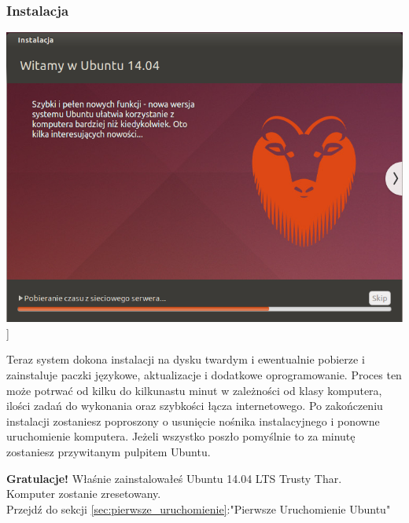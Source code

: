 \subsubsection{Instalacja}
\begin{center}
        \includegraphics[scale=0.5]{images/instalator_kopiowanie.png}]
\end{center}
Teraz system dokona instalacji na dysku twardym i ewentualnie pobierze i zainstaluje paczki językowe, aktualizacje i dodatkowe oprogramowanie. Proces ten może potrwać od kilku do kilkunastu minut w zależności od klasy komputera, ilości zadań do wykonania oraz szybkości łącza internetowego.
Po zakończeniu instalacji zostaniesz poproszony o usunięcie nośnika instalacyjnego i ponowne uruchomienie komputera. Jeżeli wszystko poszło pomyślnie to za minutę zostaniesz przywitanym pulpitem Ubuntu.
\begin{flushright}
\textbf{Gratulacje!} Właśnie zainstalowałeś Ubuntu 14.04 LTS Trusty Thar.\\
Komputer zostanie zresetowany.\\
Przejdź do sekcji \ref{sec:pierwsze_uruchomienie}:"Pierwsze Uruchomienie Ubuntu"
\end{flushright}
\clearpage
